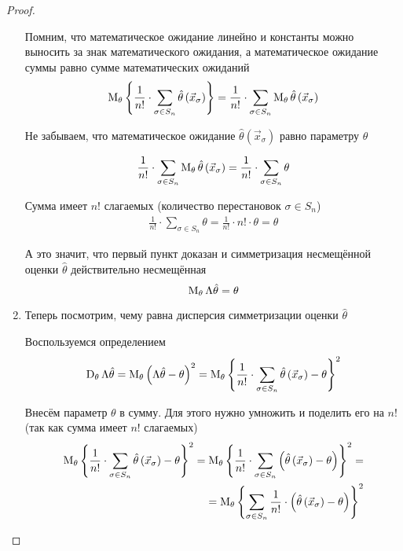 \begin{proof}
\begin{enumerate}
      Помним, что математическое ожидание линейно и
      константы можно выносить за знак математического ожидания,
      а математическое ожидание суммы равно сумме математических ожиданий
      \begin{align*}
          \operatorname{M}_{\theta} \left\{\frac{1}{n!}\cdot\sum_{\sigma\in S_n}
        \hat{\theta}\left(\vec{x}_\sigma\right)\right\}
        = \frac{1}{n!}\cdot\sum_{\sigma\in S_n}
            \operatorname{M}_{\theta} \hat{\theta}\left(\vec{x}_\sigma\right)
      \end{align*}

      Не забываем, что математическое ожидание
      $\hat{\theta}\left( \vec{x}_{\sigma} \right)$ равно параметру
      $\theta$

      \begin{align*}
          \frac{1}{n!}\cdot\sum_{\sigma\in S_n}
        \operatorname{M}_{\theta} \hat{\theta}\left(\vec{x}_\sigma\right)
        = \frac{1}{n!}\cdot\sum_{\sigma\in S_n}\theta
      \end{align*}

      Сумма имеет $n!$ слагаемых (количество перестановок $\sigma\in S_n$)
      \begin{align*}
          \frac{1}{n!}\cdot\sum_{\sigma\in S_n}\theta
        = \frac{1}{n!}\cdot n!\cdot\theta
        = \theta
      \end{align*}

      А это значит, что первый пункт доказан и симметризация
      несмещённой оценки $\hat{\theta}$ действительно несмещённая
      $$\operatorname{M}_{\theta} \Lambda\hat{\theta}= \theta$$
      \item
      Теперь посмотрим, чему равна дисперсия симметризации
      оценки $\hat{\theta}$

      Воспользуемся определением
      \begin{align*}
          \operatorname{D}_{\theta} \Lambda\hat{\theta}
        = \operatorname{M}_{\theta} 
            \left(\Lambda\hat{\theta}-\theta\right)^2
        = \operatorname{M}_{\theta} 
            \left\{\frac{1}{n!}\cdot\sum_{\sigma\in S_n}
        \hat{\theta}\left(\vec{x}_\sigma\right)
        -\theta\right\}^2
      \end{align*}

      Внесём параметр $\theta$ в сумму.
      Для этого нужно умножить и поделить его на $n!$
      (так как сумма имеет $n!$ слагаемых)
      \begin{align*}
        \operatorname{M}_{\theta} \left\{\frac{1}{n!}\cdot\sum_{\sigma\in S_n}
          \hat{\theta}\left(\vec{x}_\sigma\right)-\theta\right\}^2
        = \operatorname{M}_{\theta} 
          \left\{\frac{1}{n!}\cdot\sum_{\sigma\in S_n}
      \left(\hat{\theta}\left(\vec{x}_\sigma\right)
      -\theta\right)\right\}^2 = \\
        = \operatorname{M}_{\theta} 
          \left\{\sum_{\sigma\in S_n}\frac{1}{n!}\cdot
      \left(\hat{\theta}\left(\vec{x}_\sigma\right)
      -\theta\right)\right\}^2
      \end{align*}


\end{enumerate}
\end{proof}
